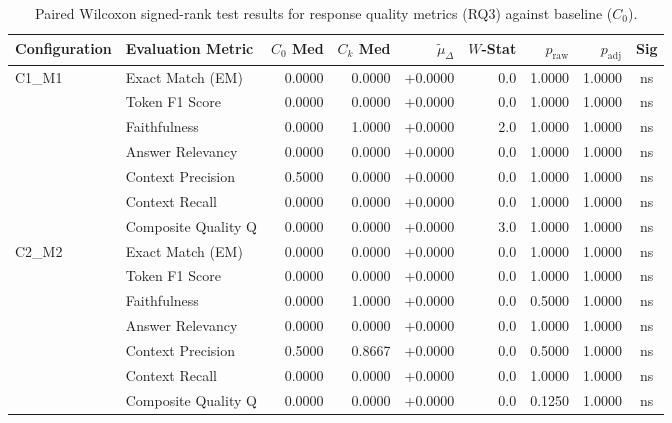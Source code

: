 \begin{table}[p]
\centering
\scriptsize
\setlength{\tabcolsep}{2.4pt}
\renewcommand{\arraystretch}{0.92}
\caption{Paired Wilcoxon signed-rank test results for response quality metrics (RQ3) against baseline ($C_0$).}
\label{tab:wilcoxon_rq3}
\begin{tabular*}{\textwidth}{@{\extracolsep{\fill}} l l r r r r r r c @{}}
\toprule
\textbf{Configuration} & \textbf{Evaluation Metric} & \textbf{$C_0$ Med} & \textbf{$C_k$ Med} & \textbf{$\tilde{\mu}_\Delta$} & \textbf{$W$-Stat} & \textbf{$p_{\text{raw}}$} & \textbf{$p_{\text{adj}}$} & \textbf{Sig} \\
\midrule
C1\_M1          & Exact Match (EM)    & 0.0000 & 0.0000 & +0.0000 & 0.0 & 1.0000 & 1.0000 & ns \\
               & Token F1 Score      & 0.0000 & 0.0000 & +0.0000 & 0.0 & 1.0000 & 1.0000 & ns \\
               & Faithfulness        & 0.0000 & 1.0000 & +0.0000 & 2.0 & 1.0000 & 1.0000 & ns \\
               & Answer Relevancy    & 0.0000 & 0.0000 & +0.0000 & 0.0 & 1.0000 & 1.0000 & ns \\
               & Context Precision   & 0.5000 & 0.0000 & +0.0000 & 0.0 & 1.0000 & 1.0000 & ns \\
               & Context Recall      & 0.0000 & 0.0000 & +0.0000 & 0.0 & 1.0000 & 1.0000 & ns \\
               & Composite Quality Q & 0.0000 & 0.0000 & +0.0000 & 3.0 & 1.0000 & 1.0000 & ns \\
\addlinespace
C2\_M2          & Exact Match (EM)    & 0.0000 & 0.0000 & +0.0000 & 0.0 & 1.0000 & 1.0000 & ns \\
               & Token F1 Score      & 0.0000 & 0.0000 & +0.0000 & 0.0 & 1.0000 & 1.0000 & ns \\
               & Faithfulness        & 0.0000 & 1.0000 & +0.0000 & 0.0 & 0.5000 & 1.0000 & ns \\
               & Answer Relevancy    & 0.0000 & 0.0000 & +0.0000 & 0.0 & 1.0000 & 1.0000 & ns \\
               & Context Precision   & 0.5000 & 0.8667 & +0.0000 & 0.0 & 0.5000 & 1.0000 & ns \\
               & Context Recall      & 0.0000 & 0.0000 & +0.0000 & 0.0 & 1.0000 & 1.0000 & ns \\
               & Composite Quality Q & 0.0000 & 0.0000 & +0.0000 & 0.0 & 0.1250 & 1.0000 & ns \\

\end{tabular*}
\end{table}
